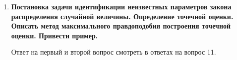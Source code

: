 \documentclass[12pt]{report}
\begin{document}
\begin{enumerate}
	\item \textbf{Постановка задачи идентификации неизвестных параметров закона распределения случайной величины. Определение точечной оценки. Описать метод максимального правдоподобия
		построения точечной оценки. Привести пример.}
	
	Ответ на первый и второй вопрос смотреть в ответах на вопрос 11.
	
	\begin{figure}[!h]
	\end{figure}
	\begin{figure}[!h]

\end{figure}
\end{enumerate}
\end{document}

